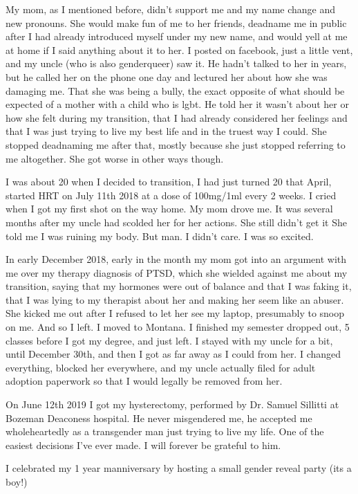 {My mom, as I mentioned before, didn't support me and my name change and new
pronouns. She would make fun of me to her friends, deadname me in public after
I had already introduced myself under my new name, and would yell at me at home
if I said anything about it to her. I posted on facebook, just a little vent,
and my uncle (who is also genderqueer) saw it. He hadn't talked to her in
years, but he called her on the phone one day and lectured her about how she
was damaging me. That she was being a bully, the exact opposite of what should
be expected of a mother with a child who is lgbt. He told her it wasn't about
her or how she felt during my transition, that I had already considered her
feelings and that I was just trying to live my best life and in the truest way
I could. She stopped deadnaming me after that, mostly because she just stopped
referring to me altogether. She got worse in other ways though.

I was about 20 when I decided to transition, I had just turned 20 that April,
started HRT on July 11th 2018 at a dose of 100mg/1ml every 2 weeks. I cried
when I got my first shot on the way home. My mom drove me. It was several
months after my uncle had scolded her for her actions. She still didn't get it
She told me I was ruining my body. But man. I didn't care. I was so excited.

In early December 2018, early in the month my mom got into an argument with me
over my therapy diagnosis of PTSD, which she wielded against me about my
transition, saying that my hormones were out of balance and that I was faking
it, that I was lying to my therapist about her and making her seem like an
abuser. She kicked me out after I refused to let her see my laptop, presumably
to snoop on me. And so I left. I moved to Montana. I finished my semester
dropped out, 5 classes before I got my degree, and just left. I stayed with my
uncle for a bit, until December 30th, and then I got as far away as I could
from her. I changed everything, blocked her everywhere, and my uncle actually
filed for adult adoption paperwork so that I would legally be removed from her.

On June 12th 2019 I got my hysterectomy, performed by Dr. Samuel Sillitti at
Bozeman Deaconess hospital. He never misgendered me, he accepted me
wholeheartedly as a transgender man just trying to live my life. One of the
easiest decisions I've ever made. I will forever be grateful to him.

I celebrated my 1 year manniversary by hosting a small gender reveal party (its
a boy!)

}
